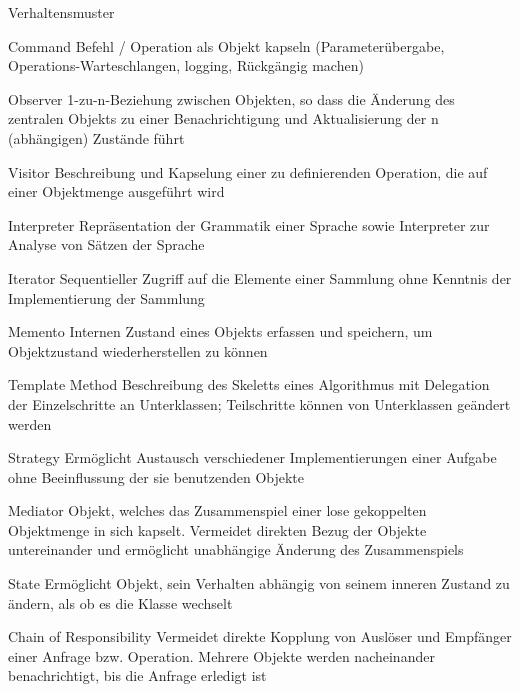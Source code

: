 \documentclass[a4paper]{article}
\begin{document}
\begin{multicols}{3}
  Verhaltensmuster
  \begin{description*}
    \item[Command] Befehl / Operation als Objekt kapseln (Parameterübergabe, Operations-Warteschlangen, logging, Rückgängig machen)
    \item[Observer] 1-zu-n-Beziehung zwischen Objekten, so dass die Änderung des zentralen Objekts zu einer Benachrichtigung und Aktualisierung der n (abhängigen) Zustände führt
    \item[Visitor] Beschreibung und Kapselung einer zu definierenden Operation, die auf einer Objektmenge ausgeführt wird
    \item[Interpreter] Repräsentation der Grammatik einer Sprache sowie Interpreter zur Analyse von Sätzen der Sprache
    \item[Iterator] Sequentieller Zugriff auf die Elemente einer Sammlung ohne Kenntnis der Implementierung der Sammlung
    \item[Memento] Internen Zustand eines Objekts erfassen und speichern, um Objektzustand wiederherstellen zu können
    \item[Template Method] Beschreibung des Skeletts eines Algorithmus mit Delegation der Einzelschritte an Unterklassen; Teilschritte können von Unterklassen geändert werden
    \item[Strategy] Ermöglicht Austausch verschiedener Implementierungen einer Aufgabe ohne Beeinflussung der sie benutzenden Objekte
    \item[Mediator] Objekt, welches das Zusammenspiel einer lose gekoppelten Objektmenge in sich kapselt. Vermeidet direkten Bezug der Objekte untereinander und ermöglicht unabhängige Änderung des Zusammenspiels
    \item[State] Ermöglicht Objekt, sein Verhalten abhängig von seinem inneren Zustand zu ändern, als ob es die Klasse wechselt
    \item[Chain of Responsibility] Vermeidet direkte Kopplung von Auslöser und Empfänger einer Anfrage bzw. Operation. Mehrere Objekte werden nacheinander benachrichtigt, bis die Anfrage erledigt ist
  \end{description*}


\end{multicols}
\end{document}
